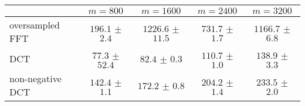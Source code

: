 \centering
\renewcommand{\arraystretch}{1.2}
\begin{tabular}{@{}lcccc@{}}
\toprule
 & $m=800$ & $m=1600$ & $m=2400$ & $m=3200$\\
\midrule
oversampled FFT & $196.1$ $\pm$ $2.4$ & $1226.6$ $\pm$ $11.5$ & $731.7$ $\pm$ $1.7$ & $1166.7$ $\pm$ $6.8$ \\
DCT & $77.3$ $\pm$ $52.4$ & $82.4$ $\pm$ $0.3$ & $110.7$ $\pm$ $1.0$ & $138.9$ $\pm$ $3.3$ \\
non-negative DCT & $142.4$ $\pm$ $1.1$ & $172.2$ $\pm$ $0.8$ & $204.2$ $\pm$ $1.4$ & $233.5$ $\pm$ $2.0$ \\
\bottomrule
\end{tabular}
